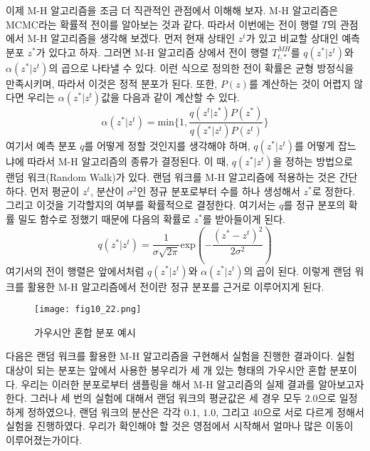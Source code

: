 \documentclass[a4paper]{oblivoir}
\begin{document}
이제 M-H 알고리즘을 조금 더 직관적인 관점에서 이해해 보자. M-H 알고리즘은 MCMC라는 확률적 전이를 알아보는 것과 같다. 따라서 이번에는 전이 행렬 $T$의 관점에서 M-H 알고리즘을 생각해 보겠다. 먼저 현재 상태인 $z^t$가 있고 비교할 상대인 예측 분포 $z^{*}$가 있다고 하자. 그러면 M-H 알고리즘 상에서 전이 행렬 $T_{t,*}^{MH}$를 $q(z^{*}|z^{t})$와 $\alpha(z^{*}|z^{t})$의 곱으로 나타낼 수 있다. 이런 식으로 정의한 전이 확률은 균형 방정식을 만족시키며, 따라서 이것은 정적 분포가 된다. 또한, $P(z)$를 계산하는 것이 어렵지 않다면 우리는 $\alpha(z^{*}|z^{t})$값을 다음과 같이 계산할 수 있다. 
\begin{equation}
\alpha(z^{*}|z^{t}) = \textrm{min} \{ 1, \frac{q(z^{t}|z^{*})P(z^{*})}{q(z^{*}|z^{t})P(z^{t})} \}
\label{eq:10-20}
\end{equation} 
여기서 예측 분포 $q$를 어떻게 정할 것인지를 생각해야 하며, $q(z^{*}|z^{t})$를 어떻게 잡느냐에 따라서 M-H 알고리즘의 종류가 결정된다. 이 때, $q(z^{*}|z^{t})$을 정하는 방법으로 랜덤 워크(Random Walk)가 있다. 랜덤 워크를 M-H 알고리즘에 적용하는 것은 간단하다. 먼저 평균이 $z^{t}$, 분산이 $\sigma^2$인 정규 분포로부터 수를 하나 생성해서 $z^{*}$로 정한다. 그리고 이것을 기각할지의 여부를 확률적으로 결정한다. 여기서는 $q$를 정규 분포의 확률 밀도 함수로 정했기 때문에 다음의 확률로 $z^{*}$를 받아들이게 된다. 
\begin{equation}
q(z^{*}|z^{t}) = \frac{1}{\sigma \sqrt{2 \pi}} \textrm{exp} (-\frac{(z^{*}-z^{t})^{2}}{2\sigma^2})
\label{eq:10-21}
\end{equation}
여기서의 전이 행렬은 앞에서처럼 $q(z^{*}|z^{t})$와 $\alpha(z^{*}|z^{t})$의 곱이 된다. 이렇게 랜덤 워크를 활용한 M-H 알고리즘에서 전이란 정규 분포를 근거로 이루어지게 된다. \\

\begin{figure}[ht] \centering 
\texttt{[image: fig10\_22.png]} 
\caption{가우시안 혼합 분포 예시}
\label{fig:10-11-1}
\end{figure}  

다음은 랜덤 워크를 활용한 M-H 알고리즘을 구현해서 실험을 진행한 결과이다. 실험 대상이 되는 분포는 앞에서 사용한 봉우리가 세 개 있는 형태의 가우시안 혼합 분포이다. 우리는 이러한 분포로부터 샘플링을 해서 M-H 알고리즘의 실제 결과를 알아보고자 한다. 그러나 세 번의 실험에 대해서 랜덤 워크의 평균값은 세 경우 모두 $2.0$으로 일정하게 정하였으나, 랜덤 워크의 분산은 각각 $0.1$, $1.0$, 그리고 $40$으로 서로 다르게 정해서 실험을 진행하였다. 우리가 확인해야 할 것은 영점에서 시작해서 얼마나 많은 이동이 이루어졌는가이다. \\
\end{document}
